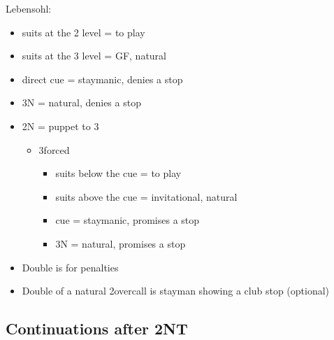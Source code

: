\documentclass[a4paper,14pt]{extarticle}
\begin{document}
Lebensohl:

\begin{itemize}
\item suits at the 2 level = to play
\item suits at the 3 level = GF, natural
\item direct cue = staymanic, denies a stop
\item 3N = natural, denies a stop
\item 2N = puppet to 3\clubs
	\begin{itemize}
	\item 3\clubs forced
		\begin{itemize}
		\item suits below the cue = to play
		\item suits above the cue = invitational, natural
		\item cue = staymanic, promises a stop
		\item 3N = natural, promises a stop
		\end{itemize}
	\end{itemize}
\item Double is for penalties
\item Double of a natural 2\clubs overcall is stayman showing a club stop (optional)
\end{itemize}

\newpage

\subsection{Continuations after 2NT}
\label{sec:resp:2n}
\end{document}
